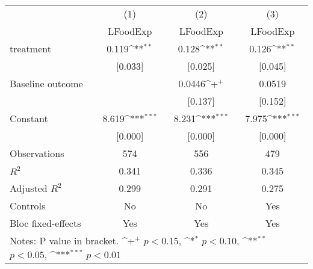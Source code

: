 {
\def\sym#1{\ifmmode^{#1}\else\(^{#1}\)\fi}
\begin{tabular*}{1.2\hsize}{@{\hskip\tabcolsep\extracolsep\fill}l*{3}{c}}
\cline{1-4}\cline{1-4}
     &\multicolumn{1}{c}{(1)}&\multicolumn{1}{c}{(2)}&\multicolumn{1}{c}{(3)}\\
     &\multicolumn{1}{c}{LFoodExp}&\multicolumn{1}{c}{LFoodExp}&\multicolumn{1}{c}{LFoodExp}\\
\cline{1-4}
treatment&0.119\sym{**} &0.128\sym{**} &0.126\sym{**} \\
     &[0.033]         &[0.025]         &[0.045]         \\
[1em]
Baseline outcome&           &0.0446\sym{+}  &0.0519         \\
     &           &[0.137]         &[0.152]         \\
[1em]
Constant&8.619\sym{***}&8.231\sym{***}&7.975\sym{***}\\
     &[0.000]         &[0.000]         &[0.000]         \\
\cline{1-4}
Observations&574         &556         &479         \\
\(R^{2}\)&0.341         &0.336         &0.345         \\
Adjusted \(R^{2}\)&0.299         &0.291         &0.275         \\
Controls&No         &No         &Yes         \\
Bloc fixed-effects&Yes         &Yes         &Yes         \\
\cline{1-4}\cline{1-4}
\multicolumn{4}{p{1.0\textwidth}}{\footnotesize Notes: P value in bracket. \sym{+} \(p<0.15\), \sym{*} \(p<0.10\), \sym{**} \(p<0.05\), \sym{***} \(p<0.01\)}\\
\end{tabular*}
}
